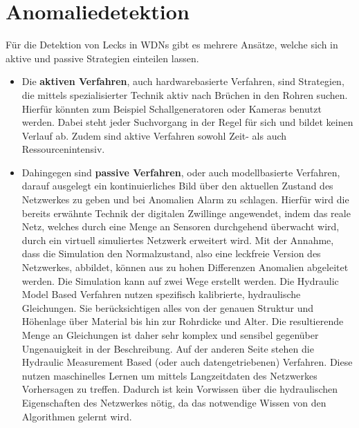 \chapter{Anomaliedetektion}

Für die Detektion von Lecks in WDNs gibt es mehrere Ansätze, welche sich in aktive und passive
 Strategien einteilen lassen.

\begin{itemize}
    
    \item Die \textbf{aktiven Verfahren}, auch hardwarebasierte Verfahren, sind Strategien, die mittels
     spezialisierter Technik aktiv nach Brüchen in den Rohren suchen. Hierfür könnten zum Beispiel
     Schallgeneratoren oder Kameras benutzt werden. Dabei steht jeder Suchvorgang in der Regel für sich
     und bildet keinen Verlauf ab. Zudem sind aktive Verfahren sowohl Zeit- als auch Ressourcenintensiv.

    \item Dahingegen sind \textbf{passive Verfahren}, oder auch modellbasierte Verfahren, darauf ausgelegt
     ein kontinuierliches Bild über den aktuellen Zustand des Netzwerkes zu geben und bei Anomalien Alarm zu
     schlagen. Hierfür wird die bereits erwähnte Technik der digitalen Zwillinge angewendet, indem das reale
     Netz, welches durch eine Menge an Sensoren durchgehend überwacht wird, durch ein virtuell simuliertes
     Netzwerk erweitert wird. Mit der Annahme, dass die Simulation den Normalzustand, also eine leckfreie
     Version des Netzwerkes, abbildet, können aus zu hohen Differenzen Anomalien abgeleitet werden. Die
     Simulation kann auf zwei Wege erstellt werden. Die Hydraulic Model Based Verfahren nutzen spezifisch
     kalibrierte, hydraulische Gleichungen. Sie berücksichtigen alles von der genauen Struktur und Höhenlage
     über Material bis hin zur Rohrdicke und Alter. Die resultierende Menge an Gleichungen ist daher sehr
     komplex und sensibel gegenüber Ungenauigkeit in der Beschreibung. Auf der anderen Seite stehen die
     Hydraulic Measurement Based (oder auch datengetriebenen) Verfahren. Diese nutzen maschinelles Lernen um
     mittels Langzeitdaten des Netzwerkes Vorhersagen zu treffen. Dadurch ist kein Vorwissen über die
     hydraulischen Eigenschaften des Netzwerkes nötig, da das notwendige Wissen von den Algorithmen gelernt wird.
    
\end{itemize}

